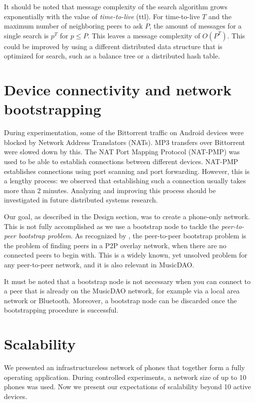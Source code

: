 It should be noted that message complexity of the search algorithm grows exponentially with the value of \textit{time-to-live} (ttl). For time-to-live $T$ and the maximum number of neighboring peers to ask $P$, the amount of messages for a single search is $p^T$ for $p\leq P$. This leaves a message complexity of $O(P^T)$. This could be improved by using a different distributed data structure that is optimized for search, such as a balance tree or a distributed hash table. 

\section{Device connectivity and network bootstrapping}
During experimentation, some of the Bittorrent traffic on Android devices were blocked by Network Address  Translators (NATs). MP3 transfers over Bittorrent were slowed down by this. The NAT Port Mapping Protocol (NAT-PMP) was used to be able to establish connections between different devices. NAT-PMP establishes connections using port scanning and port forwarding. However, this is a lengthy process: we observed that establishing such a connection usually takes more than 2 minutes. Analyzing and improving this process should be investigated in future distributed systems research.

Our goal, as described in the Design section, was to create a phone-only network. This is not fully accomplished as we use a bootstrap node to tackle the \textit{peer-to-peer bootstrap problem}. As recognized by \cite{wolinsky2010addressing}, the peer-to-peer bootstrap problem is the problem of finding peers in a P2P overlay network, when there are no connected peers to begin with. This is a widely known, yet unsolved problem for any peer-to-peer network, and it is also relevant in MusicDAO. 

It must be noted that a bootstrap node is not necessary when you can connect to a peer that is already on the MusicDAO network, for example via a local area network or Bluetooth. Moreover, a bootstrap node can be discarded once the bootstrapping procedure is successful.

\section{Scalability}
We presented an infrastructureless network of phones that together form a fully operating application. During controlled experiments, a network size of up to 10 phones was used. Now we present our expectations of scalability beyond 10 active devices. 

